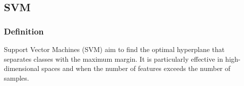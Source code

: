 \subsection{SVM}
\subsubsection{Definition}

Support Vector Machines (SVM) aim to find the optimal hyperplane that separates classes with the maximum margin. It is particularly effective in high-dimensional spaces and when the number of features exceeds the number of samples.
